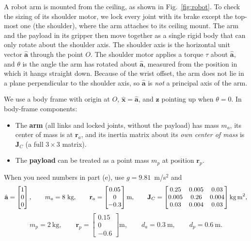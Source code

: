 \documentclass[11pt,letterpaper]{article}
\begin{document}
\noindent A robot arm is mounted from the ceiling, as shown in Fig.~\ref{fig:robot}. To check the sizing of its shoulder motor, we lock every joint with its brake except the top-most one (the shoulder), where the arm attaches to its ceiling mount. The arm and the payload in its gripper then move together as a single rigid body that can only rotate about the shoulder axis. The shoulder axis is the horizontal unit vector $\hat{\mathbf{a}}$ through the point $O$. The shoulder motor applies a torque $\tau$ about $\hat{\mathbf{a}}$, and $\theta$ is the angle the arm has rotated about $\hat{\mathbf{a}}$, measured from the position in which it hangs straight down. Because of the wrist offset, the arm does not lie in a plane perpendicular to the shoulder axis, so $\hat{\mathbf{a}}$ is \emph{not} a principal axis of the arm.

We use a body frame with origin at $O$, $\hat{\mathbf{x}} = \hat{\mathbf{a}}$, and $\hat{\mathbf{z}}$ pointing up when $\theta = 0$. In body-frame components:
\begin{itemize}
    \item The \textbf{arm} (all links and locked joints, without the payload) has mass $m_a$, its center of mass is at $\mathbf{r}_a$, and its inertia matrix about its \emph{own center of mass} is $\mathbf{J}_C$ (a full $3\times3$ matrix).
    \item The \textbf{payload} can be treated as a point mass $m_p$ at position $\mathbf{r}_p$.
\end{itemize}
When you need numbers in part (e), use $g = 9.81$~m/s$^2$ and
\[
\hat{\mathbf{a}} = \begin{bmatrix} 1 \\ 0 \\ 0 \end{bmatrix}, \qquad
m_a = 8~\text{kg}, \qquad
\mathbf{r}_a = \begin{bmatrix} 0.05 \\ 0 \\ -0.3 \end{bmatrix}\text{m}, \qquad
\mathbf{J}_C = \begin{bmatrix} 0.25 & 0.005 & 0.03 \\ 0.005 & 0.26 & 0.004 \\ 0.03 & 0.004 & 0.03 \end{bmatrix}\text{kg\,m}^2,
\]
\[
m_p = 2~\text{kg}, \qquad
\mathbf{r}_p = \begin{bmatrix} 0.15 \\ 0 \\ -0.6 \end{bmatrix}\text{m}, \qquad
d_a = 0.3~\text{m}, \qquad
d_p = 0.6~\text{m}.
\]
\end{document}
